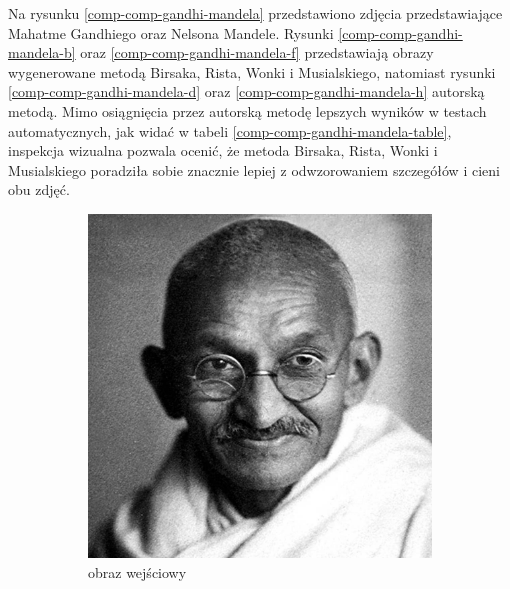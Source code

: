 	Na rysunku \ref{comp-comp-gandhi-mandela} przedstawiono zdjęcia przedstawiające Mahatme Gandhiego oraz Nelsona Mandele. Rysunki \ref{comp-comp-gandhi-mandela-b} oraz \ref{comp-comp-gandhi-mandela-f} przedstawiają obrazy wygenerowane metodą Birsaka, Rista, Wonki i Musialskiego, natomiast rysunki \ref{comp-comp-gandhi-mandela-d} oraz \ref{comp-comp-gandhi-mandela-h} autorską metodą. Mimo osiągnięcia przez autorską metodę lepszych wyników w testach automatycznych, jak widać w tabeli \ref{comp-comp-gandhi-mandela-table}, inspekcja wizualna pozwala ocenić, że metoda Birsaka, Rista, Wonki i Musialskiego poradziła sobie znacznie lepiej z odwzorowaniem szczegółów i cieni obu zdjęć. 
	\begin{figure}[H] 
    \centering
    \begin{subfigure}{0.24\textwidth}
        \centering
        \includegraphics[width = \textwidth]{img/6-comp/gandhi_original_c10_inv0.png}
        \caption{obraz wejściowy}
        \label{comp-comp-gandhi-mandela-a}
    \end{subfigure}
    \begin{subfigure}{0.24\textwidth}
        \centering

\end{subfigure}
\end{figure}
